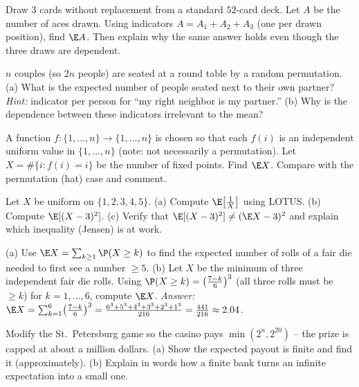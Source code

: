 \begin{exercise}
\label{ch08:exr-linearity}
Draw $3$ cards without replacement from a standard $52$-card deck. Let $A$ be the
number of aces drawn. Using indicators $A = A_1 + A_2 + A_3$ (one per drawn
position), find $\E A$. Then explain why the same answer holds even though the
three draws are dependent.
\end{exercise}

\begin{exercise}
\label{ch08:exr-hats}
$n$ couples (so $2n$ people) are seated at a round table by a random permutation.
(a) What is the expected number of people seated next to their own partner?
\emph{Hint:} indicator per person for ``my right neighbor is my partner.''
(b) Why is the dependence between these indicators irrelevant to the mean?
\end{exercise}

\begin{exercise}
\label{ch08:exr-fixedpoints}
A function $f:\{1,\dots,n\}\to\{1,\dots,n\}$ is chosen so that each $f(i)$ is an
independent uniform value in $\{1,\dots,n\}$ (note: not necessarily a
permutation). Let $X = \#\{i : f(i) = i\}$ be the number of fixed points. Find
$\E X$. Compare with the permutation (hat) case and comment.
\end{exercise}

\begin{exercise}
\label{ch08:exr-lotus}
Let $X$ be uniform on $\{1,2,3,4,5\}$.
(a) Compute $\E\!\left[\tfrac{1}{X}\right]$ using LOTUS.
(b) Compute $\E[(X-3)^2]$.
(c) Verify that $\E[(X-3)^2] \ne (\E X - 3)^2$ and explain which inequality
(Jensen) is at work.
\end{exercise}

\begin{exercise}
\label{ch08:exr-tailsum}
(a) Use $\E X = \sum_{k\ge1}\P(X\ge k)$ to find the expected number of rolls of a
fair die needed to first see a number $\ge 5$.
(b) Let $X$ be the minimum of three independent fair die rolls. Using
$\P(X \ge k) = \bigl(\tfrac{7-k}{6}\bigr)^3$ (all three rolls must be $\ge k$) for
$k = 1,\dots,6$, compute $\E X$. \emph{Answer:} $\E X = \sum_{k=1}^{6}\bigl(\tfrac{7-k}{6}\bigr)^3
= \tfrac{6^3+5^3+4^3+3^3+2^3+1^3}{216} = \tfrac{441}{216} \approx 2.04$.
\end{exercise}

\begin{exercise}
\label{ch08:exr-stpete}
Modify the St.\ Petersburg game so the casino pays $\min(2^n, 2^{20})$ -- the prize
is capped at about a million dollars.
(a) Show the expected payout is finite and find it (approximately).
(b) Explain in words how a finite bank turns an infinite expectation into a small
one.
\end{exercise}

